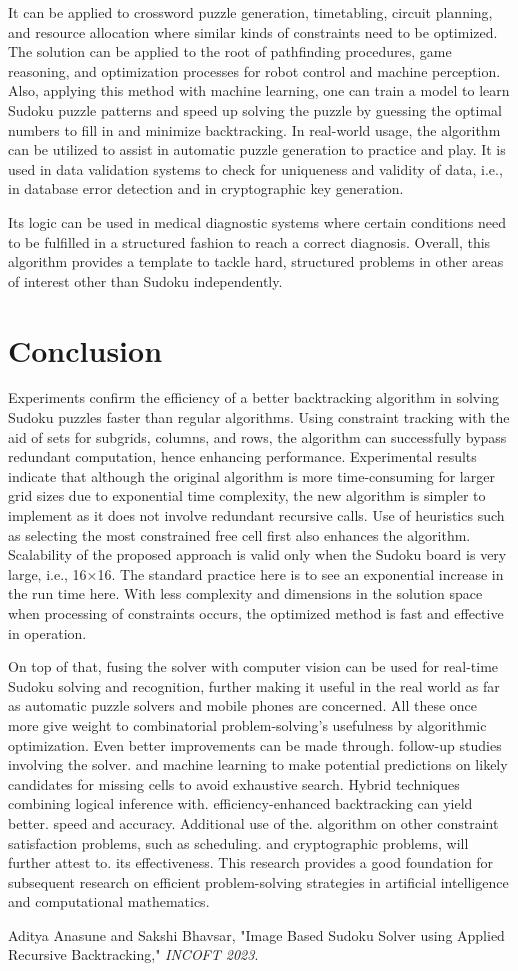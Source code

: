 \documentclass[conference]{IEEEtran}
\begin{document}
It can be applied to crossword puzzle generation, timetabling, circuit planning, and resource allocation where similar kinds of constraints need to be optimized. The solution can be applied to the root of pathfinding procedures, game reasoning, and optimization processes for robot control and machine perception. Also, applying this method with machine learning, one can train a model to learn Sudoku puzzle patterns and speed up solving the puzzle by guessing the optimal numbers to fill in and minimize backtracking. In real-world usage, the algorithm can be utilized to assist in automatic puzzle generation to practice and play. It is used in data validation systems to check for uniqueness and validity of data, i.e., in database error detection and in cryptographic key generation.

Its logic can be used in medical diagnostic systems where certain conditions need to be fulfilled in a structured fashion to reach a correct diagnosis. Overall, this algorithm provides a template to tackle hard, structured problems in other areas of interest other than Sudoku independently.

\section{Conclusion}
Experiments confirm the efficiency of a better backtracking algorithm in solving Sudoku puzzles faster than regular algorithms. Using constraint tracking with the aid of sets for subgrids, columns, and rows, the algorithm can successfully bypass redundant computation, hence enhancing performance. Experimental results indicate that although the original algorithm is more time-consuming for larger grid sizes due to exponential time complexity, the new algorithm is simpler to implement as it does not involve redundant recursive calls. Use of heuristics such as selecting the most constrained free cell first also enhances the algorithm. Scalability of the proposed approach is valid only when the Sudoku board is very large, i.e., 16×16. The standard practice here is to see an exponential increase in the run time here. With less complexity and dimensions in the solution space when processing of constraints occurs, the optimized method is fast and effective in operation.

On top of that, fusing the solver with computer vision can be used for real-time Sudoku solving and recognition, further making it useful in the real world as far as automatic puzzle solvers and mobile phones are concerned. All these once more give weight to combinatorial problem-solving's usefulness by algorithmic optimization. Even better improvements can be made through. follow-up studies involving the solver. and machine learning to make potential predictions on likely candidates for missing cells to avoid exhaustive search. Hybrid techniques combining logical inference with. efficiency-enhanced backtracking can yield better. speed and accuracy. Additional use of the. algorithm on other constraint satisfaction problems, such as scheduling. and cryptographic problems, will further attest to. its effectiveness. This research provides a good foundation for subsequent research on efficient problem-solving strategies in artificial intelligence and computational mathematics.

\begin{thebibliography}{99}
 Aditya Anasune and Sakshi Bhavsar, "Image Based Sudoku Solver using Applied Recursive Backtracking," \textit{INCOFT 2023}.
\end{thebibliography}
\end{document}
